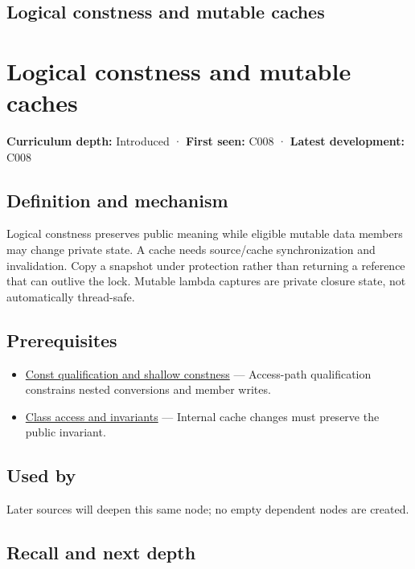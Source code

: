 \hypertarget{appendix-f5593256bcaf}{}
\section*{Logical constness and mutable caches}
\chapter{Logical constness and mutable caches}\label{appendix-f5593256bcaf-logical-constness-and-mutable-caches}

\textbf{Curriculum depth:} Introduced · \textbf{First seen:} C008 · \textbf{Latest development:} C008

\section{Definition and mechanism}\label{appendix-f5593256bcaf-definition-and-mechanism}

Logical constness preserves public meaning while eligible mutable data members may change private state. A cache needs source/cache synchronization and invalidation. Copy a snapshot under protection rather than returning a reference that can outlive the lock. Mutable lambda captures are private closure state, not automatically thread-safe.

\section{Prerequisites}\label{appendix-f5593256bcaf-prerequisites}

\begin{itemize}
\tightlist
\item
  \hyperref[appendix-c25d60fed375]{Const qualification and shallow constness} --- Access-path qualification constrains nested conversions and member writes.
\item
  \hyperref[appendix-8e5214819615]{Class access and invariants} --- Internal cache changes must preserve the public invariant.
\end{itemize}

\section{Used by}\label{appendix-f5593256bcaf-used-by}

Later sources will deepen this same node; no empty dependent nodes are created.

\section{Recall and next depth}\label{appendix-f5593256bcaf-recall-and-next-depth}

